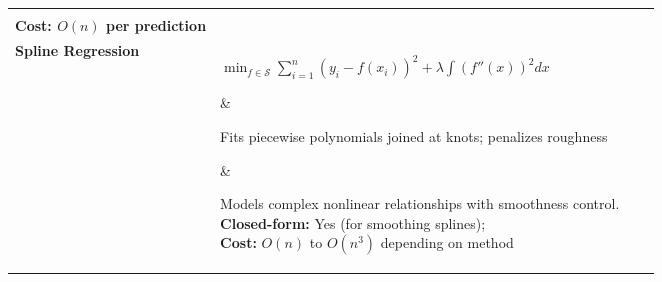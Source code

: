 \documentclass[10pt]{article}
\begin{document}
\begin{longtable}{|>{\bfseries}m{3cm}|m{5cm}|p{3.5cm}|p{8cm}|}
{				\textbf{Closed-form:} No; direct computation for each $x$; \\
				\textbf{Cost:} $O(n)$ per prediction
				\vspace{4pt}
		} \\
		\hline
		Spline Regression & \parbox{5cm}{
				$\min_{f \in \mathcal{S}} \sum_{i=1}^n (y_i - f(x_i))^2 + \lambda \int (f''(x))^2 dx$
		} & \parbox{3.5cm}{\vspace{2pt}Fits piecewise polynomials joined at knots; penalizes
		roughness} & \parbox{8cm}{\vspace{2pt}
				Models complex nonlinear relationships with smoothness control. \\
				\textbf{Closed-form:} Yes (for smoothing splines); \\
				\textbf{Cost:} $O(n)$ to $O(n^3)$ depending on method
				\vspace{4pt}
		} \\
		\hline
		k-Nearest Neighbors Regression & \parbox{5cm}{
				$\hat{y}(x) = \frac{1}{k} \sum_{i \in N_k(x)} y_i$
		} & \parbox{3.5cm}{\vspace{2pt}Averages the $k$ nearest neighbors' responses for
		prediction} & \parbox{8cm}{\vspace{2pt}
				Non-parametric, adapts to local data structure. \\
				\textbf{Closed-form:} No; requires distance computation for each query; \\
				\textbf{Cost:} $O(n)$ per prediction
				\vspace{4pt}
		} \\
		\hline
\end{longtable}
\end{document}
